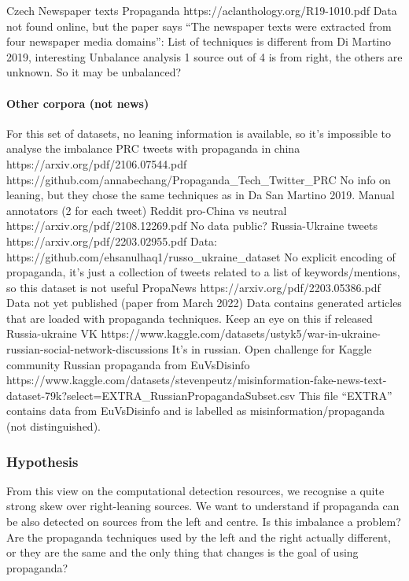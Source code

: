 Czech Newspaper texts Propaganda
https://aclanthology.org/R19-1010.pdf
Data not found online, but the paper says “The newspaper texts were extracted from four newspaper media domains”: 
List of techniques is different from Di Martino 2019, interesting
Unbalance analysis
1 source out of 4 is from right, the others are unknown. So it may be unbalanced?

\paragraph{Other corpora (not news)}
For this set of datasets, no leaning information is available, so it’s impossible to analyse the imbalance
PRC tweets with propaganda in china
https://arxiv.org/pdf/2106.07544.pdf
https://github.com/annabechang/Propaganda\_Tech\_Twitter\_PRC 
No info on leaning, but they chose the same techniques as in Da San Martino 2019. Manual annotators (2 for each tweet)
Reddit pro-China vs neutral
https://arxiv.org/pdf/2108.12269.pdf 
No data public?
Russia-Ukraine tweets
https://arxiv.org/pdf/2203.02955.pdf 
Data: https://github.com/ehsanulhaq1/russo\_ukraine\_dataset 
No explicit encoding of propaganda, it’s just a collection of tweets related to a list of keywords/mentions, so this dataset is not useful
PropaNews
https://arxiv.org/pdf/2203.05386.pdf
Data not yet published (paper from March 2022)
Data contains generated articles that are loaded with propaganda techniques. Keep an eye on this if released
Russia-ukraine VK
https://www.kaggle.com/datasets/ustyk5/war-in-ukraine-russian-social-network-discussions 
It’s in russian. Open challenge for Kaggle community
Russian propaganda from EuVsDisinfo
https://www.kaggle.com/datasets/stevenpeutz/misinformation-fake-news-text-dataset-79k?select=EXTRA\_RussianPropagandaSubset.csv 
This file “EXTRA” contains data from EuVsDisinfo and is labelled as misinformation/propaganda (not distinguished).

\subsubsection{Hypothesis}
From this view on the computational detection resources, we recognise a quite strong skew over right-leaning sources. We want to understand if propaganda can be also detected on sources from the left and centre.
Is this imbalance a problem? Are the propaganda techniques used by the left and the right actually different, or they are the same and the only thing that changes is the goal of using propaganda?


